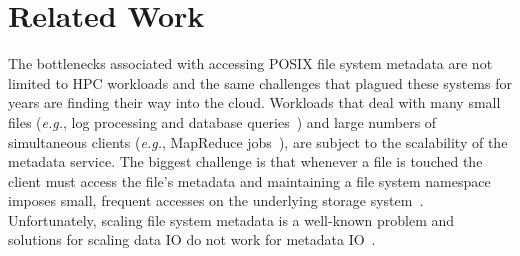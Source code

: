 \section{Related Work} 
\label{sec:related-work}

The bottlenecks associated with accessing POSIX file system metadata are not limited
to HPC workloads and the same challenges that plagued these systems for years are
finding their way into the cloud. Workloads that deal with many small files
({\it e.g.}, log processing and database
queries~\cite{thusoo:sigmod2010-facebook-infrastructure}) and large numbers of
simultaneous clients ({\it e.g.}, MapReduce
jobs~\cite{mckusick:acm2010-gfs-evolution}), are subject to the scalability of
the metadata service. The biggest challenge is that whenever a file
is touched the client must access the file's metadata and maintaining a file
system namespace imposes small, frequent accesses on the underlying storage
system~\cite{roselli:atec2000-FS-workloads}.  Unfortunately, scaling file
system metadata is a well-known problem and solutions for scaling data IO do
not work for metadata IO~\cite{roselli:atec2000-FS-workloads,
abad:techreport2012-fstrace, abad:ucc2012-mimesis,
alam:pdsw2011-metadata-scaling, weil:osdi2006-ceph}. 
%
%
